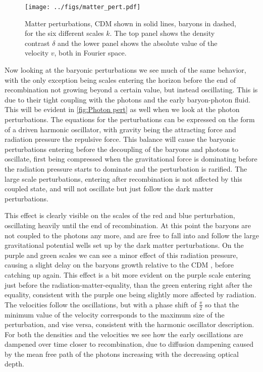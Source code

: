 \documentclass[10pt,a4paper]{article}
\providecommand{\rCDM}
{\ensuremath{
\textrm{CDM}
}
}
\begin{document}
\begin{figure}[ht!]
\centering
\texttt{[image: ../figs/matter\_pert.pdf]}
\caption{Matter perturbations, \rCDM shown in solid lines, baryons in dashed, for the six different scales $k$. The top panel shows the density contrast $\delta$ and the lower panel shows the absolute value of the velocity $v$, both in Fourier space.}
\label{fig:matter pert}
\end{figure}

Now looking at the baryonic perturbations we see much of the same behavior, with the only exception being scales entering the horizon before the end of recombination not growing beyond a certain value, but instead oscillating. This is due to their tight coupling with the photons and the early baryon-photon fluid. This will be evident in \cref{fig:Photon pert} as well when we look at the photon perturbations. The equations for the perturbations can be expressed on the form of a driven harmonic oscillator, with gravity being the attracting force and radiation pressure the repulsive force. This balance will cause the baryonic perturbations entering before the decoupling of the baryons and photons to oscillate, first being compressed when the gravitational force is dominating before the radiation pressure starts to dominate and the perturbation is rarified. The large scale perturbations, entering after recombination is not affected by this coupled state, and will not oscillate but just follow the dark matter perturbations.

This effect is clearly visible on the scales of the red and blue perturbation, oscillating heavily until the end of recombination. At this point the baryons are not coupled to the photons any more, and are free to fall into and follow the large gravitational potential wells set up by the dark matter perturbations. On the purple and green scales we can see a minor effect of this radiation pressure, causing a slight delay on the baryons growth relative to the \rCDM, before catching up again. This effect is a bit more evident on the purple scale entering just before the radiation-matter-equality, than the green entering right after the equality, consistent with the purple one being slightly more affected by radiation. The velocities follow the oscillations, but with a phase shift of $\frac{\pi}{2}$ so that the minimum value of the velocity corresponds to the maximum size of the perturbation, and vise versa, consistent with the harmonic oscillator description. For both the densities and the velocities we see how the early oscillations are dampened over time closer to recombination, due to diffusion dampening caused by the mean free path of the photons increasing with the decreasing optical depth.
\end{document}
